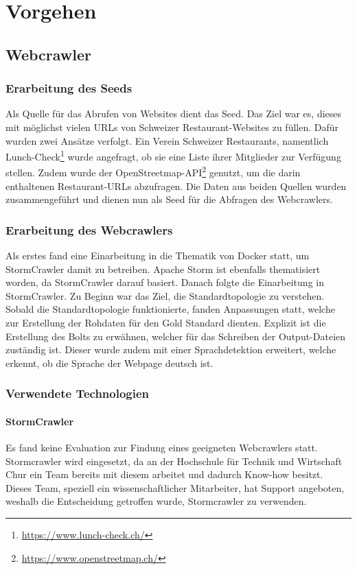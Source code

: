 \chapter{Vorgehen}
\section{Webcrawler}
\subsection{Erarbeitung des Seeds}
Als Quelle für das Abrufen von Websites dient das Seed.
Das Ziel war es, dieses mit möglichst vielen URLs von Schweizer Restaurant-Websites zu füllen.
Dafür wurden zwei Ansätze verfolgt.
Ein Verein Schweizer Restaurants, namentlich Lunch-Check\footnote{\url{https://www.lunch-check.ch/}} wurde angefragt, ob sie eine Liste ihrer Mitglieder zur Verfügung stellen.
Zudem wurde der OpenStreetmap-API\footnote{\url{https://www.openstreetmap.ch/}} genutzt, um die darin enthaltenen Restaurant-URLs abzufragen.
Die Daten aus beiden Quellen wurden zusammengeführt und dienen nun als Seed für die Abfragen des Webcrawlers.
\subsection{Erarbeitung des Webcrawlers}
Als erstes fand eine Einarbeitung in die Thematik von Docker statt, um StormCrawler damit zu betreiben.
Apache Storm ist ebenfalls thematisiert worden, da StormCrawler darauf basiert.
Danach folgte die Einarbeitung in StormCrawler.
Zu Beginn war das Ziel, die Standardtopologie zu verstehen.
Sobald die Standardtopologie funktionierte, fanden Anpassungen statt, welche zur Erstellung der Rohdaten für den Gold Standard dienten.
Explizit ist die Erstellung des Bolts zu erwähnen, welcher für das Schreiben der Output-Dateien zuständig ist.
Dieser wurde zudem mit einer Sprachdetektion erweitert, welche erkennt, ob die Sprache der Webpage deutsch ist.
\subsection{Verwendete Technologien}
\subsubsection{StormCrawler}
Es fand keine Evaluation zur Findung eines geeigneten Webcrawlers statt.
Stormcrawler wird eingesetzt, da an der Hochschule für Technik und Wirtschaft Chur ein Team bereits mit diesem arbeitet und dadurch Know-how besitzt.
Dieses Team, speziell ein wissenschaftlicher Mitarbeiter, hat Support angeboten, weshalb die Entscheidung getroffen wurde, Stormcrawler zu verwenden.
